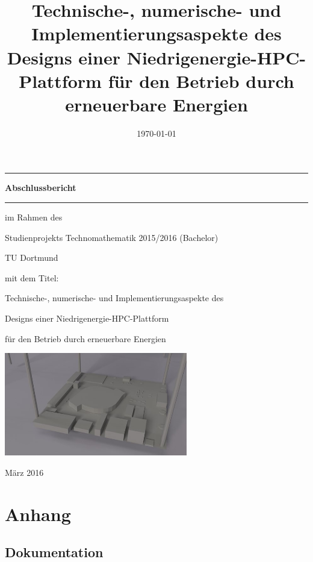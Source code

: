 \documentclass[12pt,a4paper, oneside,ngerman]{scrartcl}
\title{\large{Technische-, numerische- und Implementierungsaspekte des Designs einer Niedrigenergie-HPC-Plattform für den Betrieb durch erneuerbare Energien}}
\date{\today}
\begin{document}
\thispagestyle{empty}
\newcommand{\Rule}{\rule{\textwidth}{1mm}}
\begin{center}
\Rule\vspace{5mm}
\sffamily\bfseries\Huge
\sf Abschlussbericht
\vspace{1mm}\Rule
\vfill
\small im Rahmen des\par
\Large Studienprojekts Technomathematik 2015/2016 (Bachelor)\par TU Dortmund\par
\vfill
\small mit dem Titel:\par
\Large Technische-, numerische- und Implementierungsaspekte des\par 
Designs einer Niedrigenergie-HPC-Plattform\par für den Betrieb durch erneuerbare Energien\par
\vfill
\includegraphics[width=0.6\textwidth]{Bilder/figures/render6}\par
\vfill
{\small {}}\par
\vspace{1mm}
{\Large {}}\par
\vspace{2mm}
{\small {}}\par
\vspace{1mm}
{\Large {}}\par
{\small {}}\par
{\Large {}}\par

\vfill
{März 2016}
\end{center}
\newpage
\thispagestyle{empty}
\sf

\newpage
\tableofcontents
\newpage





%

\section{Anhang}

\subsection{Dokumentation}
%
\end{document}
